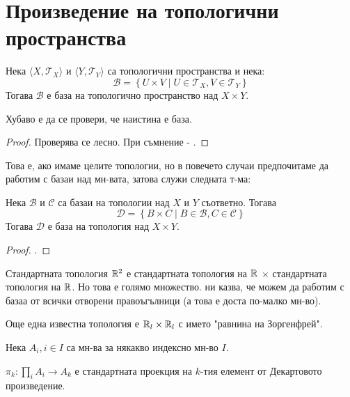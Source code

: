 \section{Произведение на топологични пространства}
\begin{definition}
    Нека $\langle X, \mathcal T_X \rangle$ и $\langle Y,\mathcal T_Y \rangle$ са топологични пространства и нека:
    \begin{equation*}
        \mathcal B = \left\{U \times V \mid U \in \mathcal T_X, V \in \mathcal T_Y\right\}
    \end{equation*}
    Тогава $\mathcal B$ е база на топологично пространство над $X \times Y$.
\end{definition}
Хубаво е да се провери, че наистина е база.
\begin{proof}
    Проверява се лесно. При съмнение - \cite[стр.~86]{munkrestopology}.
\end{proof}
Това е, ако имаме целите топологии, но в повечето случаи предпочитаме да работим с базаи над мн-вата, затова служи следната т-ма:
\begin{theorem}\label{thm:basis-of-times}
    Нека $\mathcal B$ и $\mathcal C$ са базаи на топологии над $X$ и $Y$ съответно. Тогава
    \begin{equation*}
        \mathcal D = \left\{ B \times C \mid B \in \mathcal B, C \in \mathcal C \right\}
    \end{equation*}
    Тогава $\mathcal D$ е база на топология над $X \times Y$.
\end{theorem}
\begin{proof}
    \cite[стр.~87]{munkrestopology}.
\end{proof}
\begin{example}
    Стандартната топология ${\mathbb{R}}^2$ е стандартната топология на ${\mathbb{R}}$ $\times$ стандартната топология на ${\mathbb{R}}$. Но това е голямо множество.  ни казва, че можем да работим с базаа от всички отворени правоъгълници (а това е доста по-малко мн-во).
\end{example}
\begin{example}
    Още една известна топология е ${\mathbb{R}}_l \times {\mathbb{R}}_l$ с името "равнина на Зоргенфрей".
\end{example}
\begin{notation} 
    Нека $A_i, i \in I$ са мн-ва за някакво индексно мн-во $I$.
    
    $\pi_k : \prod\limits_i A_i \to A_k$ е стандартната проекция на $k$-тия елемент от Декартовото произведение.
\end{notation}
